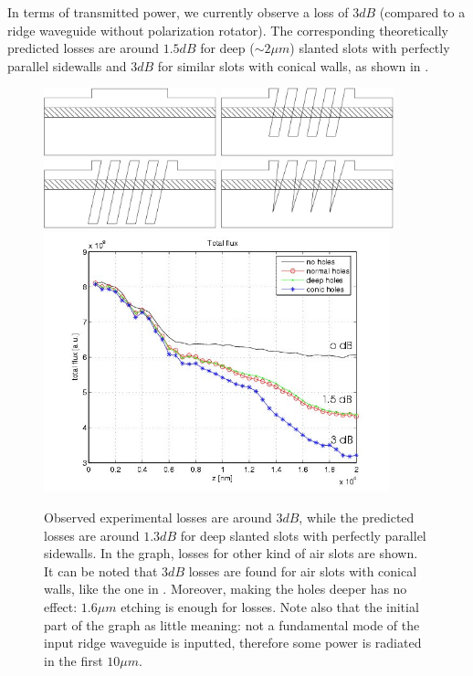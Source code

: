 In terms of transmitted power, we currently observe a loss of $3 dB$
(compared to a ridge waveguide without polarization rotator). The
corresponding theoretically predicted losses are around $1.5 dB$ for
deep ($\sim 2 \mu m$) slanted slots with perfectly parallel sidewalls
and $3 dB$ for similar slots with conical walls, as shown in
.

\begin{figure}[htbp]
  \begin{center}
    \includegraphics[width=5cm]{pics/polrot_no_holes}
    \includegraphics[width=5cm]{pics/polrot_normal_holes}
    \includegraphics[width=5cm]{pics/polrot_deep_holes}
    \includegraphics[width=5cm]{pics/polrot_conical_holes}
    \includegraphics[width=10cm]{pics/polrot_different_holes}
  \end{center}
  \caption{Observed experimental losses are around $3 dB$, while the
    \threeDFDTD predicted losses are around $1.3 dB$ for deep slanted
    slots with perfectly parallel sidewalls. In the graph, losses for
    other kind of air slots are shown. It can be noted that $3 dB$
    losses are found for air slots with conical walls, like the one in
    . Moreover, making the
    holes deeper has no effect: $1.6 \mu m$ etching is enough for
    losses. Note also that the initial part of the graph as little
    meaning: not a fundamental mode of the input ridge waveguide is
    inputted, therefore some power is radiated in the first $10 \mu
    m$.}
  \label{fig:polrot_holes}
\end{figure}


